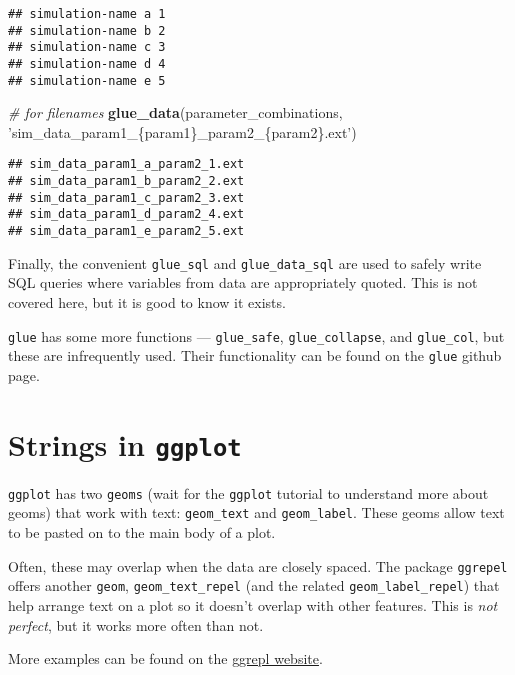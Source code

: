 \documentclass[
]{book}
\newenvironment{Shaded}{}{}
\newcommand{\CommentTok}[1]{\textcolor[rgb]{0.38,0.63,0.69}{\textit{#1}}}
\newcommand{\KeywordTok}[1]{\textcolor[rgb]{0.00,0.44,0.13}{\textbf{#1}}}
\newcommand{\NormalTok}[1]{#1}
\newcommand{\StringTok}[1]{\textcolor[rgb]{0.25,0.44,0.63}{#1}}
\begin{document}
\begin{verbatim}
## simulation-name a 1
## simulation-name b 2
## simulation-name c 3
## simulation-name d 4
## simulation-name e 5
\end{verbatim}

\begin{Shaded}
\begin{Highlighting}[]
\CommentTok{# for filenames}
\KeywordTok{glue_data}\NormalTok{(parameter_combinations,}
          \StringTok{'sim_data_param1_\{param1\}_param2_\{param2\}.ext'}\NormalTok{)}
\end{Highlighting}
\end{Shaded}

\begin{verbatim}
## sim_data_param1_a_param2_1.ext
## sim_data_param1_b_param2_2.ext
## sim_data_param1_c_param2_3.ext
## sim_data_param1_d_param2_4.ext
## sim_data_param1_e_param2_5.ext
\end{verbatim}

Finally, the convenient \texttt{glue\_sql} and \texttt{glue\_data\_sql} are used to safely write SQL queries where variables from data are appropriately quoted. This is not covered here, but it is good to know it exists.

\texttt{glue} has some more functions --- \texttt{glue\_safe}, \texttt{glue\_collapse}, and \texttt{glue\_col}, but these are infrequently used. Their functionality can be found on the \texttt{glue} github page.

\hypertarget{strings-in-ggplot}{%
\section{\texorpdfstring{Strings in \texttt{ggplot}}{Strings in ggplot}}\label{strings-in-ggplot}}

\texttt{ggplot} has two \texttt{geoms} (wait for the \texttt{ggplot} tutorial to understand more about geoms) that work with text: \texttt{geom\_text} and \texttt{geom\_label}. These geoms allow text to be pasted on to the main body of a plot.

Often, these may overlap when the data are closely spaced. The package \texttt{ggrepel} offers another \texttt{geom}, \texttt{geom\_text\_repel} (and the related \texttt{geom\_label\_repel}) that help arrange text on a plot so it doesn't overlap with other features. This is \emph{not perfect}, but it works more often than not.

More examples can be found on the \href{https://github.com/slowkow/ggrepel}{ggrepl website}.
\end{document}

